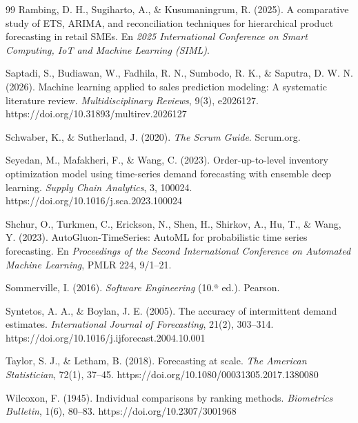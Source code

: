 \begin{thebibliography}{99}
 Rambing, D. H., Sugiharto, A., \& Kusumaningrum, R. (2025). A comparative study of ETS, ARIMA, and reconciliation techniques for hierarchical product forecasting in retail SMEs. En \textit{2025 International Conference on Smart Computing, IoT and Machine Learning (SIML)}.

 Saptadi, S., Budiawan, W., Fadhila, R. N., Sumbodo, R. K., \& Saputra, D. W. N. (2026). Machine learning applied to sales prediction modeling: A systematic literature review. \textit{Multidisciplinary Reviews}, 9(3), e2026127. https://doi.org/10.31893/multirev.2026127

 Schwaber, K., \& Sutherland, J. (2020). \textit{The Scrum Guide}. Scrum.org.

 Seyedan, M., Mafakheri, F., \& Wang, C. (2023). Order-up-to-level inventory optimization model using time-series demand forecasting with ensemble deep learning. \textit{Supply Chain Analytics}, 3, 100024. https://doi.org/10.1016/j.sca.2023.100024

 Shchur, O., Turkmen, C., Erickson, N., Shen, H., Shirkov, A., Hu, T., \& Wang, Y. (2023). AutoGluon-TimeSeries: AutoML for probabilistic time series forecasting. En \textit{Proceedings of the Second International Conference on Automated Machine Learning}, PMLR 224, 9/1--21.

 Sommerville, I. (2016). \textit{Software Engineering} (10.ª ed.). Pearson.

 Syntetos, A. A., \& Boylan, J. E. (2005). The accuracy of intermittent demand estimates. \textit{International Journal of Forecasting}, 21(2), 303--314. https://doi.org/10.1016/j.ijforecast.2004.10.001

 Taylor, S. J., \& Letham, B. (2018). Forecasting at scale. \textit{The American Statistician}, 72(1), 37--45. https://doi.org/10.1080/00031305.2017.1380080

 Wilcoxon, F. (1945). Individual comparisons by ranking methods. \textit{Biometrics Bulletin}, 1(6), 80--83. https://doi.org/10.2307/3001968

\end{thebibliography}